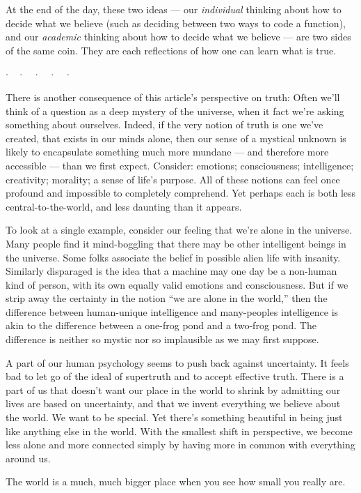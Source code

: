 \documentclass[11pt, oneside]{article}
\newcommand{\dotq}{\cdot\quad}
\newcommand{\scenebreak}{
    \medskip\centerline{$\dotq\dotq\dotq\dotq\cdot$}\medskip
}
\begin{document}
At the end of the day, these two ideas --- our {\em individual}
thinking about how to
decide what we believe (such as deciding between two ways to code a function),
and our {\em academic} thinking about how to decide what we believe --- are two
sides of the same coin. They are each reflections of how one can learn what is
true.

\scenebreak

There is another consequence of this article's perspective on truth:
Often we'll think of a question as a deep mystery of the
universe, when it fact we're asking something about ourselves.
Indeed, if the very notion of truth is one we've created, that exists in our
minds alone, then our sense of a mystical unknown is likely to encapsulate
something much more mundane --- and therefore more accessible --- than we first
expect.
Consider:
emotions; consciousness; intelligence; creativity; morality; a sense of life's
purpose. All of these notions can feel once profound and impossible to
completely comprehend. Yet perhaps each is both less central-to-the-world, and
less daunting than it appears.

To look at a single example, consider our feeling that we're alone in the
universe.
Many people find it mind-boggling
that there may be other intelligent beings in the
universe.
Some folks associate the belief in possible alien life with insanity.
Similarly disparaged is
the idea that a machine may one day be a non-human kind of
person, with its own equally valid emotions and consciousness.
But if we strip away the certainty in the notion ``we are alone
in the world,'' then the difference between human-unique intelligence and
many-peoples intelligence is akin to the difference between a one-frog pond
and a two-frog pond.
The difference is neither so mystic nor so implausible as we may first suppose.

A part of our human psychology seems to push back against uncertainty. It
feels bad to let go of the ideal of supertruth and to accept effective
truth. There is a part of us that doesn't want our place in the world to
shrink by admitting our lives are based on uncertainty, and that we invent
everything we believe about the world.
We want to be special. Yet there's something beautiful in being just
like anything else in the world. With the smallest shift in perspective,
we become
less alone and more connected simply by having more in common with everything
around us.

The world is a much, much bigger place when you see how small you really are.
\end{document}
